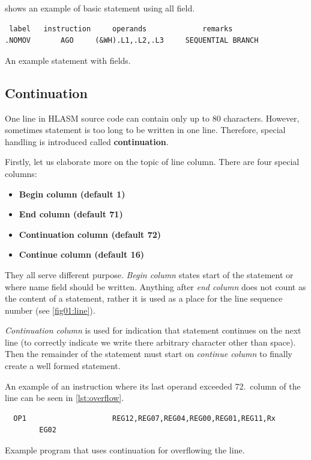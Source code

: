  shows an example of basic statement using all field.
\begin{listing}
\begin{verbatim}
 label   instruction     operands             remarks
.NOMOV       AGO     (&WH).L1,.L2,.L3     SEQUENTIAL BRANCH
\end{verbatim}
\caption{An example statement with fields.}
\label{lst:example}
\end{listing}

\subsection{Continuation}

One line in HLASM source code can contain only up to 80 characters. However, sometimes statement is too long to be written in one line. Therefore, special handling is introduced called \textbf{continuation}.

Firstly, let us elaborate more on the topic of line column. There are four special columns:
\begin{itemize}
	\item \textbf{Begin column (default 1)}
	
	\item \textbf{End column (default 71)}
	
	\item \textbf{Continuation column (default 72)}
	
	\item \textbf{Continue column (default 16)}
\end{itemize}
They all serve different purpose. \textit{Begin column} states start of the statement or where name field should be written. Anything after \textit{end column} does not count as the content of a statement, rather it is used as a place for the line sequence number (see \ref{fig01:line}). 

\textit{Continuation column} is used for indication that statement continues on the next line (to correctly indicate we write there arbitrary character other than space). Then the remainder of the statement must start on \textit{continue column} to finally create a well formed statement.

An example of an instruction where its last operand exceeded 72.~column of the line can be seen in \cref{lst:overflow}.
\begin{listing}
\begin{verbatim}
  OP1                    REG12,REG07,REG04,REG00,REG01,REG11,Rx
        EG02
\end{verbatim}
\caption{Example program that uses continuation for overflowing the line.}
\label{lst:overflow}
\end{listing}

